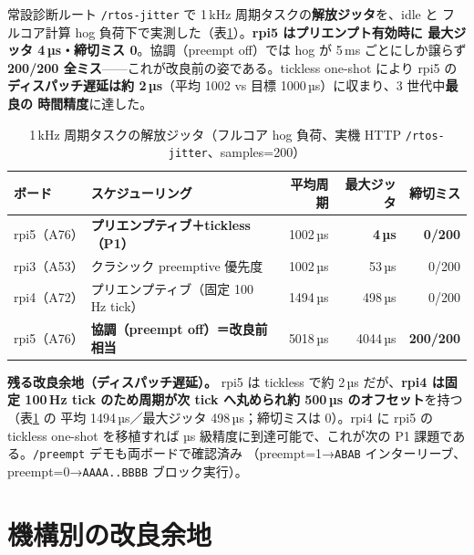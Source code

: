 \documentclass[11pt,a4paper]{article}
\newcommand{\code}[1]{\texttt{\small #1}}
\newcommand{\limt}[1]{\textbf{\textcolor{red!55!black}{#1}}}
\newcommand{\fix}[1]{\textbf{\textcolor{green!35!black}{#1}}}
\begin{document}
常設診断ルート \code{/rtos-jitter} で 1\,kHz 周期タスクの\textbf{解放ジッタ}を、idle と
フルコア計算 hog 負荷下で実測した（表\ref{tab:jitter}）。\textbf{rpi5 はプリエンプト有効時に
最大ジッタ 4\,µs・締切ミス 0}。協調（preempt off）では hog が 5\,ms ごとにしか譲らず
\textbf{200/200 全ミス}——これが改良前の姿である。tickless one-shot により rpi5 の
\textbf{ディスパッチ遅延は約 2\,µs}（平均 1002 vs 目標 1000\,µs）に収まり、3 世代中\textbf{最良の
時間精度}に達した。

\begin{table}[h]\centering
\caption{1\,kHz 周期タスクの解放ジッタ（フルコア hog 負荷、実機 HTTP \code{/rtos-jitter}、samples=200）}\label{tab:jitter}
\small
\begin{tabularx}{\linewidth}{@{}lXrrr@{}}
\toprule
ボード & スケジューリング & 平均周期 & 最大ジッタ & 締切ミス \\
\midrule
rpi5（A76） & \textbf{プリエンプティブ＋tickless（P1）} & 1002\,µs & \textbf{4\,µs} & \textbf{0/200} \\
rpi3（A53） & クラシック preemptive 優先度 & 1002\,µs & 53\,µs & 0/200 \\
rpi4（A72） & プリエンプティブ（固定 100\,Hz tick） & 1494\,µs & 498\,µs & 0/200 \\
\midrule
rpi5（A76） & \limt{協調（preempt off）＝改良前相当} & 5018\,µs & 4044\,µs & \limt{200/200} \\
\bottomrule
\end{tabularx}
\end{table}

\fix{残る改良余地（ディスパッチ遅延）。} rpi5 は tickless で約 2\,µs だが、\textbf{rpi4 は固定
100\,Hz tick のため周期が次 tick へ丸められ約 500\,µs のオフセット}を持つ（表\ref{tab:jitter} の
平均 1494\,µs／最大ジッタ 498\,µs；締切ミスは 0）。rpi4 に rpi5 の tickless one-shot を移植すれば
µs 級精度に到達可能で、これが次の P1 課題である。\code{/preempt} デモも両ボードで確認済み
（preempt=1→\code{ABAB} インターリーブ、preempt=0→\code{AAAA..BBBB} ブロック実行）。

\section{機構別の改良余地}
\end{document}
